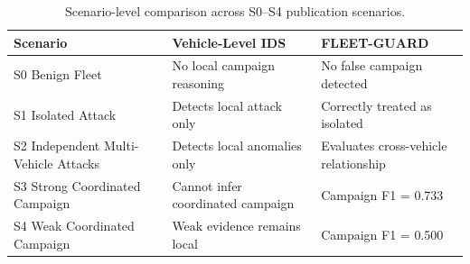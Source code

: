 \begin{table}[t]
\centering
\caption{Scenario-level comparison across S0--S4 publication scenarios.}
\label{tab:benchmark_scenario_level}
\begin{tabular}{lll}
\toprule
Scenario & Vehicle-Level IDS & FLEET-GUARD \\
\midrule
S0 Benign Fleet & No local campaign reasoning & No false campaign detected \\
S1 Isolated Attack & Detects local attack only & Correctly treated as isolated \\
S2 Independent Multi-Vehicle Attacks & Detects local anomalies only & Evaluates cross-vehicle relationship \\
S3 Strong Coordinated Campaign & Cannot infer coordinated campaign & Campaign F1 = 0.733 \\
S4 Weak Coordinated Campaign & Weak evidence remains local & Campaign F1 = 0.500 \\
\bottomrule
\end{tabular}
\end{table}
